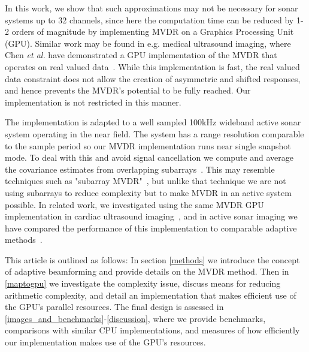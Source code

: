 \documentclass[12pt,journal,draftclsnofoot,onecolumn]{IEEEtran}
\newcommand\1{\vec 1}
\begin{document}
% 
% 


In this work, we show that such approximations may not be necessary for sonar systems up to 32 channels, since here the computation time can be reduced by 1-2 orders of magnitude by implementing MVDR on a Graphics Processing Unit (GPU). Similar work may be found in e.g. medical ultrasound imaging, where Chen \emph{et al.} have demonstrated a GPU implementation of the MVDR that operates on real valued data~\cite{Chen2011,Chen2011a}. While this implementation is fast, the real valued data constraint does not allow the creation of asymmetric and shifted responses, and hence prevents the MVDR's potential to be fully reached. Our implementation is not restricted in this manner.

The implementation is adapted to a well sampled 100\;kHz wideband active sonar system operating in the near field. The system has a range resolution comparable to the sample period so our MVDR implementation runs near single snapshot mode. To deal with this and avoid signal cancellation we compute and average the covariance estimates from overlapping subarrays~\cite{Kailath1985}. This may resemble techniques such as "subarray MVDR"~\cite{Chapman1976}, but unlike that technique we are not using subarrays to reduce complexity but to make MVDR in an active system possible. In related work, we investigated using the same MVDR GPU implementation in cardiac ultrasound imaging~\cite{Asen2012,Asen2013}, and in active sonar imaging we have compared the performance of this implementation to comparable adaptive methods~\cite{Buskenes2013}.

This article is outlined as follows: In section \ref{methods} we introduce the concept of adaptive beamforming and provide details on the MVDR method. Then in \ref{maptogpu} we investigate the complexity issue, discuss means for reducing arithmetic complexity, and detail an implementation that makes efficient use of the GPU's parallel resources. The final design is assessed in \ref{images_and_benchmarks}-\ref{discussion}, where we provide benchmarks, comparisons with similar CPU implementations, and measures of how efficiently our implementation makes use of the GPU's resources.
\end{document}
